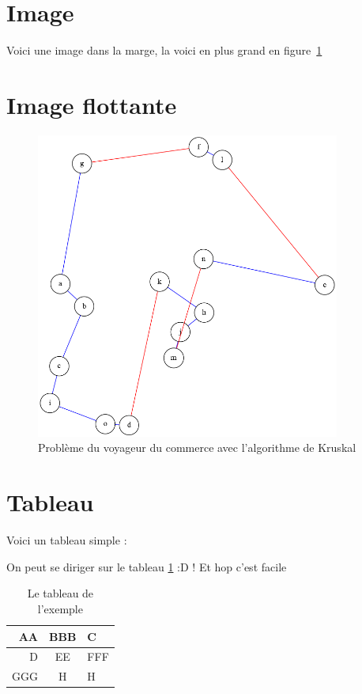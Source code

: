 \documentclass[12pt,a4paper]{scrartcl}
\theoremstyle{plain}
\begin{document}
\section{Image}

Voici une image dans la marge, la voici en plus grand en figure~\ref{kruskal} \lipsum[2]


\section{Image flottante}
\lipsum[3]
\begin{figure} %
\centering
\includegraphics[width=10cm]{tsp}
\caption{Problème du voyageur du commerce avec l'algorithme de Kruskal}\label{kruskal}
\end{figure}
\lipsum

\section{Tableau}

Voici un tableau simple :

On peut se diriger sur le tableau \ref{tab1} :D !
Et hop c'est facile \lipsum[1]

\begin{table} %
\centering

\begin{tabular}{|r|c|l|}
\hline
AA & BBB & C \\
\hline
D & EE & FFF \\ 
GGG & H & H \\
\hline
\end{tabular}

\caption{Le tableau de l'exemple}\label{tab1}

\end{table}
\end{document}
